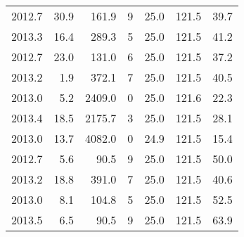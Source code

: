 \begin{tabular}{rrrrrrr}
2012.7 & 30.9 & 161.9 & 9 & 25.0 & 121.5 & 39.7 \\
2013.3 & 16.4 & 289.3 & 5 & 25.0 & 121.5 & 41.2 \\
2012.7 & 23.0 & 131.0 & 6 & 25.0 & 121.5 & 37.2 \\
2013.2 & 1.9 & 372.1 & 7 & 25.0 & 121.5 & 40.5 \\
2013.0 & 5.2 & 2409.0 & 0 & 25.0 & 121.6 & 22.3 \\
2013.4 & 18.5 & 2175.7 & 3 & 25.0 & 121.5 & 28.1 \\
2013.0 & 13.7 & 4082.0 & 0 & 24.9 & 121.5 & 15.4 \\
2012.7 & 5.6 & 90.5 & 9 & 25.0 & 121.5 & 50.0 \\
2013.2 & 18.8 & 391.0 & 7 & 25.0 & 121.5 & 40.6 \\
2013.0 & 8.1 & 104.8 & 5 & 25.0 & 121.5 & 52.5 \\
2013.5 & 6.5 & 90.5 & 9 & 25.0 & 121.5 & 63.9 \\
\bottomrule
\end{tabular}
